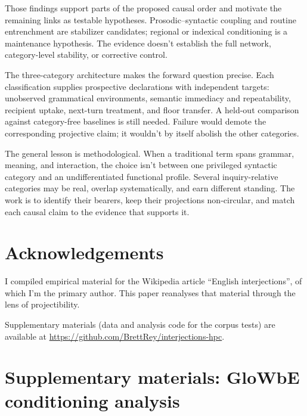 \documentclass[12pt]{article}
\newif\ifblind
\begin{document}
Those findings support parts of the proposed causal order and motivate the
remaining links as testable hypotheses. Prosodic--syntactic coupling and
routine entrenchment are stabilizer candidates; regional or indexical
conditioning is a maintenance hypothesis. The evidence doesn't establish the
full network, category-level stability, or corrective control.

The three-category architecture makes the forward question
precise. Each classification supplies prospective declarations with
independent targets: unobserved grammatical environments, semantic immediacy
and repeatability, recipient uptake, next-turn treatment, and floor transfer.
A held-out comparison against category-free baselines is still needed.
Failure would demote the corresponding projective claim; it wouldn't by
itself abolish the other categories.

The general lesson is methodological. When a traditional term spans grammar,
meaning, and interaction, the choice isn't between one privileged syntactic
category and an undifferentiated functional profile. Several inquiry-relative
categories may be real, overlap systematically, and earn different standing.
The work is to identify their bearers, keep their projections non-circular,
and match each causal claim to the evidence that supports it.

\ifblind\else
\section*{Acknowledgements}

I compiled empirical material for the Wikipedia article
\enquote{English interjections}, of which I'm the primary author. This
paper reanalyses that material through the lens of projectibility.

Supplementary materials (data and analysis code for the corpus tests)
are available at
\url{https://github.com/BrettRey/interjections-hpc}.
\fi


\clearpage
\begingroup
\setlength{\emergencystretch}{3em}
\printbibliography
\endgroup

\clearpage
\appendix
\section[Supplementary materials]{Supplementary materials: GloWbE conditioning analysis}
\label{app:conditioning}
\end{document}
